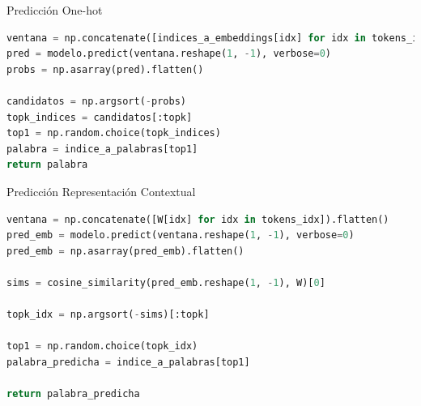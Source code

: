 \documentclass{beamer}
\begin{document}
\begin{frame}[fragile]{Predicción One-hot}
	\begin{lstlisting}[language=Python]
ventana = np.concatenate([indices_a_embeddings[idx] for idx in tokens_idx]).flatten()
pred = modelo.predict(ventana.reshape(1, -1), verbose=0)
probs = np.asarray(pred).flatten()

candidatos = np.argsort(-probs)
topk_indices = candidatos[:topk]
top1 = np.random.choice(topk_indices)
palabra = indice_a_palabras[top1]
return palabra
	\end{lstlisting}
\end{frame}

\begin{frame}[fragile]{Predicción Representación Contextual}
	\begin{lstlisting}[language=Python]
ventana = np.concatenate([W[idx] for idx in tokens_idx]).flatten()
pred_emb = modelo.predict(ventana.reshape(1, -1), verbose=0)
pred_emb = np.asarray(pred_emb).flatten()

sims = cosine_similarity(pred_emb.reshape(1, -1), W)[0]

topk_idx = np.argsort(-sims)[:topk]

top1 = np.random.choice(topk_idx)
palabra_predicha = indice_a_palabras[top1]

return palabra_predicha
	\end{lstlisting}
\end{frame}
	
	

	


	
	
\end{document}
